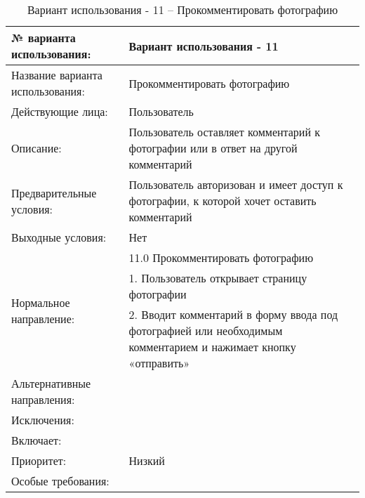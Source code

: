 \begin{table}[H]
  \caption{\onehalfspacing Вариант использования - 11 – Прокомментировать фотографию}\label{use-case-11-table}
  \begin{tabular}{|p{6cm}|p{10cm}|}
  \hline № варианта использования: & Вариант использования - 11 \\
  \hline Название варианта использования: & Прокомментировать фотографию \\
  \hline Действующие лица: & Пользователь \\
  \hline Описание: & Пользователь оставляет комментарий к фотографии или в ответ на другой комментарий \\
  \hline Предварительные условия: & Пользователь авторизован и имеет доступ к фотографии, к которой хочет оставить комментарий \\
  \hline Выходные условия: & Нет \\
  \hline \multirow{3}{*}{Нормальное направление:} & 11.0 Прокомментировать фотографию \\
  \cline{2-2} & 1. Пользователь открывает страницу фотографии \\
  \cline{2-2} & 2. Вводит комментарий в форму ввода под фотографией или необходимым комментарием и нажимает кнопку «отправить» \\
  \hline Альтернативные направления: &  \\
  \hline Исключения: &  \\
  \hline Включает: &  \\
  \hline Приоритет: & Низкий \\
  \hline Особые требования: &  \\
  \hline 
  \end{tabular}
\end{table}

